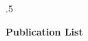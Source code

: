 
\setlength{\voffset}{-0.8in}
\setlength{\sectionskip}{0.1in}
\def\longflag{}

\moveleft.5\hoffset\centerline{\large{\bf{Publication List}}}

\begin{resume}

\end{resume}
